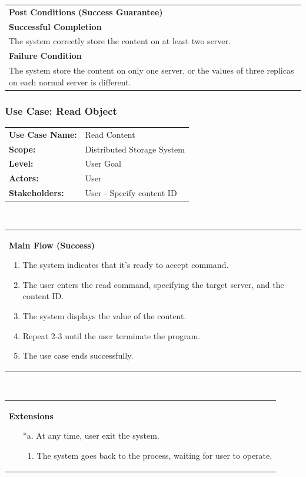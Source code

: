 \documentclass[11pt,letterpaper,en-US]{article}
\begin{document}
\begin{tabularx}{\textwidth}{X}
\textbf{Post Conditions (Success Guarantee)}\\
\textbf{Successful Completion} \\
\qquad The system correctly store the content on at least two server.\\
\textbf{Failure Condition} \\
\qquad The system store the content on only one server, or the values of three replicas on each normal server is different.\\
\end{tabularx}

\subsubsection{Use Case: Read Object}
\begin{tabularx}{\textwidth}{>{\bfseries}lX}
    Use Case Name: & Read Content\\
    Scope: & Distributed Storage System\\
    Level: & User Goal\\
    Actors: & User\\
    Stakeholders: & User - Specify content ID
\end{tabularx}\\
\begin{tabularx}{\textwidth}{X}
    \textbf{Main Flow (Success)}
    \begin{enumerate}[label={\arabic*.}]
        \item The system indicates that it's ready to accept command.
        \item The user enters the read command, specifying the target server,
            and the content ID.
        \item The system displays the value of the content.
        \item Repeat 2-3 until the user terminate the program.
        \item The use case ends successfully.
    \end{enumerate}
\end{tabularx}\\
\begin{tabularx}{\textwidth}{X}
    \textbf{Extensions}
    \begin{itemize}
        \item[*a.] At any time, user exit the system.
            \begin{enumerate}[label={\arabic*.}]
                \item The system goes back to the process, waiting for user to operate.
            \end{enumerate}
    \end{itemize}
\end{tabularx}\\
\end{document}
